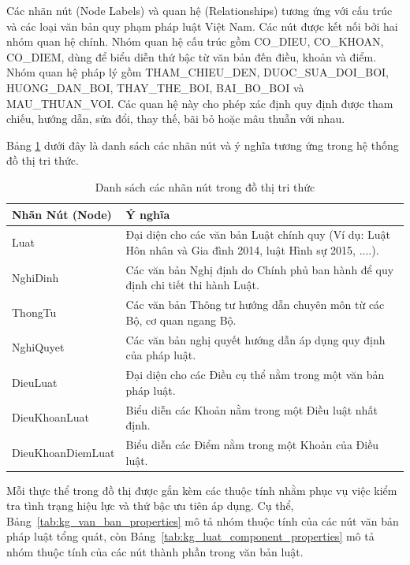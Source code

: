 \documentclass[../DoAn.tex]{subfiles}
\begin{document}
Các nhãn nút (Node Labels) và quan hệ (Relationships) tương ứng với cấu trúc và các loại văn bản quy phạm pháp luật Việt Nam. Các nút được kết nối bởi hai nhóm quan hệ chính. Nhóm quan hệ cấu trúc gồm CO\_\allowbreak DIEU, CO\_\allowbreak KHOAN, CO\_\allowbreak DIEM, dùng để biểu diễn thứ bậc từ văn bản đến điều, khoản và điểm. Nhóm quan hệ pháp lý gồm THAM\_\allowbreak CHIEU\_\allowbreak DEN, DUOC\_\allowbreak SUA\_\allowbreak DOI\_\allowbreak BOI, HUONG\_\allowbreak DAN\_\allowbreak BOI, THAY\_\allowbreak THE\_\allowbreak BOI, BAI\_\allowbreak BO\_\allowbreak BOI và MAU\_\allowbreak THUAN\_\allowbreak VOI. Các quan hệ này cho phép xác định quy định được tham chiếu, hướng dẫn, sửa đổi, thay thế, bãi bỏ hoặc mâu thuẫn với nhau.

Bảng \ref{table: Bảng nhãn nút KG} dưới đây là danh sách các nhãn nút và ý nghĩa tương ứng trong hệ thống đồ thị tri thức.

\begin{table}[H]
\centering
\footnotesize
\begin{tabularx}{\textwidth}{|>{\raggedright\arraybackslash}p{3.8cm}|>{\raggedright\arraybackslash}X|}
\hline
\textbf{Nhãn Nút (Node)} & \textbf{Ý nghĩa} \\ \hline
Luat & Đại diện cho các văn bản Luật chính quy (Ví dụ: Luật Hôn nhân và Gia đình 2014, luật Hình sự 2015, ....). \\ \hline
NghiDinh & Các văn bản Nghị định do Chính phủ ban hành để quy định chi tiết thi hành Luật. \\ \hline
ThongTu & Các văn bản Thông tư hướng dẫn chuyên môn từ các Bộ, cơ quan ngang Bộ. \\ \hline
NghiQuyet & Các văn bản nghị quyết hướng dẫn áp dụng quy định của pháp luật. \\ \hline
DieuLuat & Đại diện cho các Điều cụ thể nằm trong một văn bản pháp luật. \\ \hline
DieuKhoanLuat & Biểu diễn các Khoản nằm trong một Điều luật nhất định. \\ \hline
DieuKhoan\-DiemLuat & Biểu diễn các Điểm nằm trong một Khoản của Điều luật. \\ \hline
\end{tabularx}
\caption{Danh sách các nhãn nút trong đồ thị tri thức}
\label{table: Bảng nhãn nút KG}
\end{table}

Mỗi thực thể trong đồ thị được gắn kèm các thuộc tính nhằm phục vụ việc kiểm tra tình trạng hiệu lực và thứ bậc ưu tiên áp dụng. Cụ thể, Bảng~\ref{tab:kg_van_ban_properties} mô tả nhóm thuộc tính của các nút văn bản pháp luật tổng quát, còn Bảng~\ref{tab:kg_luat_component_properties} mô tả nhóm thuộc tính của các nút thành phần trong văn bản luật.
\end{document}
